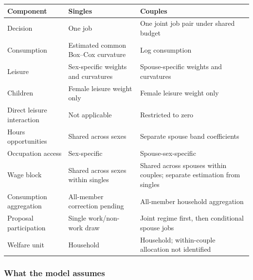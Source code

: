 \documentclass[11pt,a4paper]{article}
\begin{document}
{ %
\small\setlength{\tabcolsep}{3pt}\begin{longtable}[]{@{}
  >{\raggedright\arraybackslash}p{}
  >{\raggedright\arraybackslash}p{}
  >{\raggedright\arraybackslash}p{}@{}}
\toprule\noalign{}
\begin{minipage}[b]{\linewidth}\raggedright
Component
\end{minipage} & \begin{minipage}[b]{\linewidth}\raggedright
Singles
\end{minipage} & \begin{minipage}[b]{\linewidth}\raggedright
Couples
\end{minipage} \\
\midrule\noalign{}
\endhead
\bottomrule\noalign{}
\endlastfoot
Decision & One job & One joint job pair under shared budget \\
Consumption & Estimated common Box--Cox curvature & Log consumption \\
Leisure & Sex-specific weights and curvatures & Spouse-specific weights and curvatures \\
Children & Female leisure weight only & Female leisure weight only \\
Direct leisure interaction & Not applicable & Restricted to zero \\
Hours opportunities & Shared across sexes & Separate spouse band coefficients \\
Occupation access & Sex-specific & Spouse-sex-specific \\
Wage block & Shared across sexes within singles & Shared across spouses within couples; separate estimation from singles \\
Consumption aggregation & All-member correction pending & All-member household aggregation \\
Proposal participation & Single work/non-work draw & Joint regime first, then conditional spouse jobs \\
Welfare unit & Household & Household; within-couple allocation not identified \\
\end{longtable}
}

\subsubsection{What the model assumes}\label{what-the-model-assumes}
\end{document}
